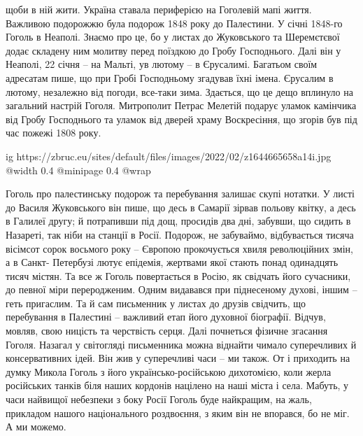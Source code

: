 щоби в ній жити. Україна ставала периферією на Гоголевій мапі життя. Важливою
подорожжю була подорож 1848 року до Палестини. У січні 1848-го Гоголь в
Неаполі. Знаємо про це, бо у листах до Жуковського та Шеремєтєвої додає
складену ним молитву перед поїздкою до Гробу Господнього. Далі він у Неаполі,
22 січня – на Мальті, ув лютому – в Єрусалимі. Багатьом своїм адресатам пише,
що при Гробі Господньому згадував їхні імена. Єрусалим в лютому, незалежно від
погоди, все-таки зима. Здається, що це дещо вплинуло на загальний настрій
Гоголя. Митрополит Петрас Мелетій подарує уламок камінчика від Гробу
Господнього та уламок від дверей храму Воскресіння, що згорів був під час
пожежі 1808 року. 

\ifcmt
  ig https://zbruc.eu/sites/default/files/images/2022/02/z1644665658a14i.jpg
  @width 0.4
  @minipage 0.4
  @wrap \parpic[r]
\fi

Гоголь про палестинську подорож та перебування залишає скупі
нотатки. У листі до Василя Жуковського він пише, що десь в Самарії зірвав
польову квітку, а десь в Галилеї другу; й потрапивши під дощ, просидів два дні,
забувши, що сидить в Назареті, так ніби на станції в Росії. Подорож, не
забуваймо, відбувається тисяча вісімсот сорок восьмого року – Європою
прокочується хвиля революційних змін, а в Санкт- Петербузі лютує епідемія,
жертвами якої стають понад одинадцять тисяч містян. Та все ж Гоголь
повертається в Росію, як свідчать його сучасники, до певної міри переродженим.
Одним видавався при піднесеному духові, іншим – геть пригаслим. Та й сам
письменник у листах до друзів свідчить, що перебування в Палестині – важливий
етап його духовної біографії. Відчув, мовляв, свою ницість та черствість серця.
Далі почнеться фізичне згасання Гоголя. Назагал у світогляді письменника можна
віднайти чимало суперечливих й консервативних ідей. Він жив у суперечливі часи
– ми також. От і приходить на думку Микола Гоголь з його українсько-російською
дихотомією, коли жерла російських танків біля наших кордонів націлено на наші
міста і села. Мабуть, у часи найвищої небезпеки з боку Росії Гоголь буде
найкращим, на жаль, прикладом нашого національного роздвоєння, з яким він не
впорався, бо не міг. А ми можемо.


